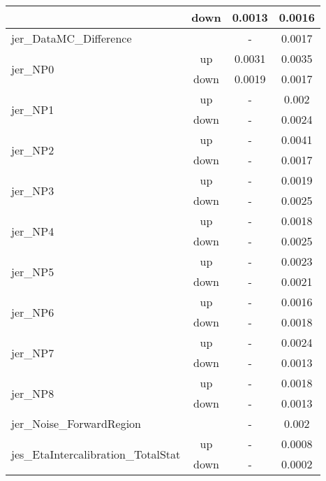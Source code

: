 \begin{table}[h!]
\begin{tabular}{lccc}
                                       & down &      0.0013     &     0.0016       \\ \hline
\multirow{2}{*}{jer\_DataMC\_Difference}  &  &  \multirow{2}{*}{-}  & \multirow{2}{*}{0.0017}  \\  \\ \hline
\multirow{2}{*}{jer\_NP0}      & up   &          0.0031     &     0.0035      \\
                                       & down &       0.0019     &     0.0017       \\ \hline
\multirow{2}{*}{jer\_NP1}      & up   &     -    &     0.002      \\
                                       & down &      -    &     0.0024       \\ \hline
\multirow{2}{*}{jer\_NP2}      & up   &     -     &     0.0041      \\
                                       & down & -     &     0.0017       \\ \hline
\multirow{2}{*}{jer\_NP3}      & up   &     -     &     0.0019      \\
                                       & down &  -     &     0.0025       \\ \hline
\multirow{2}{*}{jer\_NP4}      & up   &    -     &     0.0018      \\
                                       & down &  -    &     0.0025       \\ \hline
\multirow{2}{*}{jer\_NP5}      & up   &     -     &     0.0023      \\
                                       & down &    -     &     0.0021       \\ \hline
\multirow{2}{*}{jer\_NP6}      & up   &   -   &     0.0016      \\
                                       & down &     -    &     0.0018       \\ \hline
\multirow{2}{*}{jer\_NP7}      & up   &    -   &     0.0024      \\
                                       & down &     -    &     0.0013       \\ \hline
\multirow{2}{*}{jer\_NP8}      & up   &    -    &     0.0018      \\
                                       & down &       -    &     0.0013       \\ \hline
\multirow{2}{*}{jer\_Noise\_ForwardRegion}  &  &  \multirow{2}{*}{-}  & \multirow{2}{*}{0.002}  \\  \\ \hline
\multirow{2}{*}{jes\_EtaIntercalibration\_TotalStat}      & up   &         -    &     0.0008      \\
                                       & down &     -     &         0.0002       \\ \hline
\end{tabular}
\end{table}



